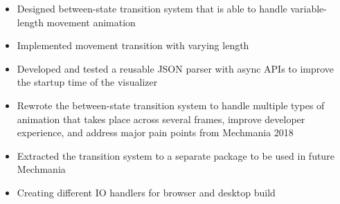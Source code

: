 
\begin{itemize}
  \item Designed between-state transition system that is able to
  handle variable-length movement animation
  \item Implemented movement transition with varying length
  \item Developed and tested a reusable JSON parser with async APIs
  to improve the startup time of the visualizer
  \item Rewrote the between-state transition system to handle multiple
  types of animation that takes place across several frames,
  improve developer experience, and address major
  pain points from Mechmania 2018
  \item Extracted the transition system to a separate package
  to be used in future Mechmania
  \item Creating different IO handlers for browser and desktop build
\end{itemize}